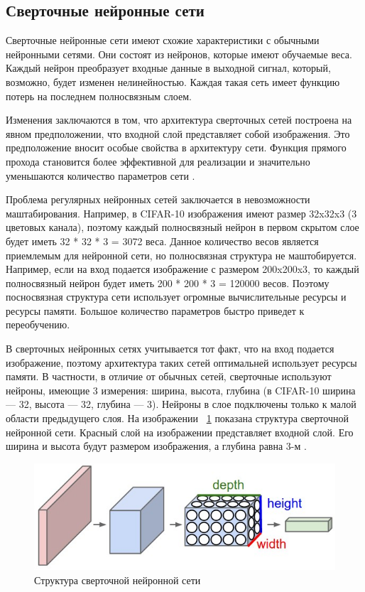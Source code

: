 \documentclass[a4paper,english,russian]{G2-105}
\begin{document}
\subsection{Сверточные нейронные сети} \ttl
\par Сверточные нейронные сети имеют схожие характеристики с обычными нейронными сетями. Они состоят из нейронов, которые имеют обучаемые веса. Каждый нейрон преобразует входные данные в выходной сигнал, который, возможно, будет изменен нелинейностью. Каждая такая сеть имеет функцию потерь на последнем полносвязным слоем.
\par Изменения заключаются в том, что архитектура сверточных сетей построена на явном предположении, что входной слой представляет собой изображения. Это предположение вносит особые свойства в архитектуру сети. Функция прямого прохода становится более эффективной для реализации и значительно уменьшаются количество параметров сети \cite{8}.
\par Проблема регулярных нейронных сетей заключается в невозможности маштабирования. Например, в CIFAR-10 изображения имеют размер 32x32x3 (3 цветовых канала), поэтому каждый полносвязный нейрон в первом скрытом слое будет иметь 32 * 32 * 3 = 3072 веса. Данное количество весов является приемлемым для нейронной сети, но полносвязная структура не маштобируется. Например, если на вход подается изображение с размером 200x200x3, то каждый полносвязный нейрон будет иметь 200 * 200 * 3 = 120000 весов. Поэтому посносвязная структура сети использует огромные вычислительные ресурсы и ресурсы памяти. Большое количество параметров быстро приведет к переобучению.
\par В сверточных нейронных сетях учитывается тот факт, что на вход подается изображение, поэтому архитектура таких сетей оптимальней использует ресурсы памяти. В частности, в отличие от обычных сетей, сверточные используют нейроны, имеющие 3 измерения: ширина, высота, глубина (в CIFAR-10 ширина --- 32, высота --- 32, глубина --- 3). Нейроны в слое подключены только к малой области предыдущего слоя. На изображении ~\ref{convnn} показана структура сверточной нейронной сети. Красный слой на изображении представляет входной слой. Его ширина и высота будут размером изображения, а глубина равна 3-м \cite{9}.
\begin{figure}
    \includegraphics[width=\linewidth]{convnn.png}
    \caption{Структура сверточной нейронной сети}
	\label{convnn}
\end{figure}
\end{document}
